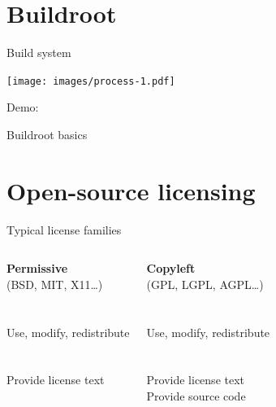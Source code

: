 \documentclass[xetex,table,table]{beamer}
\begin{document}
\section{Buildroot}

\begin{frame}{Build system}
  \begin{center}
    \texttt{[image: images/process-1.pdf]}
  \end{center}
\end{frame}

\begin{frame}[standout]
  Demo:

  Buildroot basics
\end{frame}


\section{Open-source licensing}

\begin{frame}{Typical license families}
  \begin{columns}

      \begin{center}
        {\bf Permissive}\\
        (BSD, MIT, X11\dots)\\
      {\ }\\
      \faCheckCircle\\
      Use, modify, redistribute\\
      {\ }\\
      \faExclamationCircle\\
      Provide license text \\
      {\ }
      \end{center}

      \begin{center}
        {\bf Copyleft} \\
        (GPL, LGPL, AGPL\dots)\\
      {\ }\\
      \faCheckCircle\\
      Use, modify, redistribute\\
      {\ }\\
      \faExclamationCircle\\
      Provide license text \\
      Provide source code
      \end{center}

  \end{columns}
\end{frame}
\end{document}
